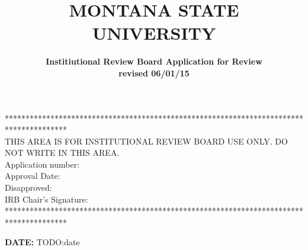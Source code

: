 \documentclass{article}
\newcommand{\response}[1]{{\color{blue}#1}}
\begin{document}
\title{\bf MONTANA STATE UNIVERSITY}
\author{\bf Institiutional Review Board Application for Review \\
    \bf revised 06/01/15
}
\date{}

\maketitle

\begin{center}
    ***************************************************************************************
    \\
    \small
    THIS AREA IS FOR INSTITUTIONAL REVIEW BOARD USE ONLY. DO NOT WRITE IN THIS
    AREA.\\
    \hspace{-4in} Application number:\\ \hspace{-4.25in}Approval Date:\\
    \hspace{-4.4in}  Disapproved:\\\hspace{-3.8in}IRB Chair's Signature:\\
    ***************************************************************************************
\end{center}

\noindent
{\bf DATE:} \response{TODO:date}
\end{document}
